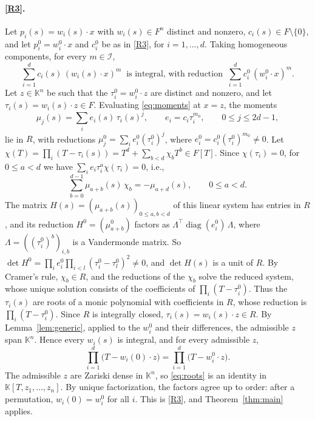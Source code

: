 \documentclass[11pt]{article}
\theoremstyle{definition}
\theoremstyle{remark}
\newcommand{\K}{\mathbb{K}}
\newcommand{\sm}{\setminus}
\begin{document}
\paragraph{\ref{R3}.} Let $p_i(s)=w_i(s)\cdot x$ with $w_i(s)\in F^n$ distinct and nonzero, $c_i(s)\in F\sm\{0\}$, and let $p_i^0=w_i^0\cdot x$ and $c_i^0$ be as in \ref{R3}, for $i=1,\dots,d$. Taking homogeneous components, for every $m\in\mathcal I$,
\begin{equation}\label{eq:moments}
\sum_{i=1}^dc_i(s)\,(w_i(s)\cdot x)^m\ \text{ is integral, with reduction }\ \sum_{i=1}^dc_i^0\,(w_i^0\cdot x)^m.
\end{equation}
Let $z\in\K^n$ be such that the $\tau_i^0=w_i^0\cdot z$ are distinct and nonzero, and let $\tau_i(s)=w_i(s)\cdot z\in F$. Evaluating \eqref{eq:moments} at $x=z$, the moments
\[
\mu_j(s)=\sum_ie_i(s)\,\tau_i(s)^j,\qquad e_i=c_i\tau_i^{m_0},\qquad 0\le j\le2d-1,
\]
lie in $R$, with reductions $\mu_j^0=\sum_ie_i^0(\tau_i^0)^j$, where $e_i^0=c_i^0(\tau_i^0)^{m_0}\ne0$. Let $\chi(T)=\prod_i(T-\tau_i(s))=T^d+\sum_{b<d}\chi_bT^b\in F[T]$. Since $\chi(\tau_i)=0$, for $0\le a<d$ we have $\sum_ie_i\tau_i^a\chi(\tau_i)=0$, i.e.,
\[
\sum_{b=0}^{d-1}\mu_{a+b}(s)\,\chi_b=-\mu_{a+d}(s),\qquad 0\le a<d.
\]
The matrix $H(s)=(\mu_{a+b}(s))_{0\le a,b<d}$ of this linear system has entries in $R$, and its reduction $H^0=(\mu_{a+b}^0)$ factors as $\Lambda^\top\operatorname{diag}(e_i^0)\,\Lambda$, where $\Lambda=((\tau_i^0)^b)_{i,b}$ is a Vandermonde matrix. So $\det H^0=\prod_ie_i^0\prod_{i<l}(\tau_i^0-\tau_l^0)^2\ne0$, and $\det H(s)$ is a unit of $R$. By Cramer's rule, $\chi_b\in R$, and the reductions of the $\chi_b$ solve the reduced system, whose unique solution consists of the coefficients of $\prod_i(T-\tau_i^0)$. Thus the $\tau_i(s)$ are roots of a monic polynomial with coefficients in $R$, whose reduction is $\prod_i(T-\tau_i^0)$. Since $R$ is integrally closed, $\tau_i(s)=w_i(s)\cdot z\in R$. By Lemma~\ref{lem:generic}, applied to the $w_i^0$ and their differences, the admissible $z$ span $\K^n$. Hence every $w_i(s)$ is integral, and for every admissible $z$,
\begin{equation}\label{eq:roots}
\prod_{i=1}^d\big(T-w_i(0)\cdot z\big)=\prod_{i=1}^d\big(T-w_i^0\cdot z\big).
\end{equation}
The admissible $z$ are Zariski dense in $\K^n$, so \eqref{eq:roots} is an identity in $\K[T,z_1,\dots,z_n]$. By unique factorization, the factors agree up to order: after a permutation, $w_i(0)=w_i^0$ for all $i$. This is \ref{R3}, and Theorem~\ref{thm:main} applies.
\end{document}
